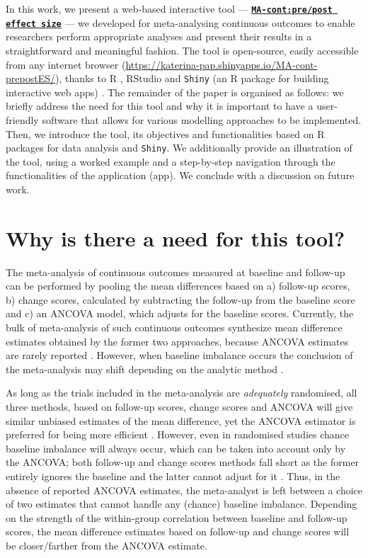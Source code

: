 \documentclass[AMA,STIX1COL]{WileyNJD-v2}
\begin{document}
In this work, we present a web-based interactive tool — \href{https://katerina-pap.shinyapps.io/MA-cont-prepostES/}{\textbf{\texttt{MA-cont:pre/post effect size}}} — we developed for meta-analysing continuous outcomes to enable researchers perform appropriate analyses and present their results in a straightforward and meaningful fashion. The tool is open-source, easily accessible from any internet browser (\url{https://katerina-pap.shinyapps.io/MA-cont-prepostES/}), thanks to R \citep{RCoreTeam2020}, RStudio \citep{Rstudiocite} and \texttt{Shiny} (an R package for building interactive web apps) \citep{chang2017shiny}. The remainder of the paper is organised as follows: we briefly address the need for this tool and why it is important to have a user-friendly software that allows for various modelling approaches to be implemented. Then, we introduce the tool, its objectives and functionalities based on R packages for data analysis and \texttt{Shiny}. We additionally provide an illustration of the tool, using a worked example and a step-by-step navigation through the functionalities of the application (app). We conclude with a discussion on future work.

\section{Why is there a need for this tool?}

The meta-analysis of continuous outcomes measured at baseline and follow-up can be performed by pooling the mean differences based on a) follow-up scores, b) change scores, calculated by subtracting the follow-up from the baseline score and c) an ANCOVA model, which adjusts for the baseline scores. Currently, the bulk of meta-analysis of such continuous outcomes synthesize mean difference estimates obtained by the former two approaches, because ANCOVA estimates are rarely reported \citep{austin2010substantial}. However, when baseline imbalance occurs the conclusion of the meta-analysis may shift depending on the analytic method \citep{fu2016change}.

As long as the trials included in the meta-analysis are \textit{adequately} randomised, all three methods, based on follow-up scores, change scores and ANCOVA will give similar unbiased estimates of the mean difference, yet the ANCOVA estimator is preferred for being more efficient \citep{senn2006change, fu2013handling, senn2013seven, senn2014baseline}. However, even in randomised studies chance baseline imbalance will always occur, which can be taken into account only by the ANCOVA; both follow-up and change scores methods fall short as the former entirely ignores the baseline and the latter cannot adjust for it \citep{vickers2001analysing}. Thus, in the absence of reported ANCOVA estimates, the meta-analyst is left between a choice of two estimates that cannot handle any (chance) baseline imbalance. Depending on the strength of the within-group correlation between baseline and follow-up scores, the mean difference estimates based on follow-up and change scores will be closer/farther from the ANCOVA estimate.
\end{document}
